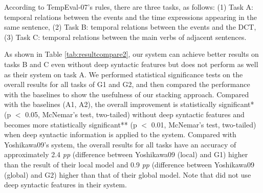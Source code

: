 \documentclass[english]{jnlp_1.4}
\begin{document}
According to TempEval-07's rules, there are three tasks, as follows:
(1) Task A: temporal relations between the events and the time expressions appearing in the same sentence,
(2) Task B: temporal relations between the events and the DCT,
(3) Task C: temporal relations between the main verbs of adjacent sentences.

\begin{table}[t]
\label{tab:resultcompare1}

\end{table}

\begin{table}[t]
\label{tab:resultcompare2}

\end{table}

As shown in Table \ref{tab:resultcompare2}, our system can achieve better results on tasks B and C even without deep syntactic features but does not perform as well as their system on task A.
We performed statistical significance tests on the overall results for all tasks of G1 and G2, and then compared the performance with the baselines to show the usefulness of our stacking approach.
Compared with the baselines (A1, A2), the overall improvement is statistically significant* (p $<$ 0.05, McNemar's test, two-tailed) without deep syntactic features and becomes more statistically significant** (p $<$ 0.01, McNemar's test, two-tailed) when deep syntactic information is applied to the system.
Compared with Yoshikawa09's system, the overall results for all tasks have an accuracy of approximately 2.4 \textit{pp} (difference between Yoshikawa09 (local) and G1) higher than the result of their local model and 0.9 \textit{pp} (difference between Yoshikawa09 (global) and G2) higher than that of their global model.
Note that  did not use deep syntactic features in their system.
\end{document}
